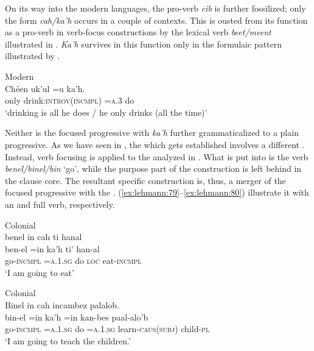 \documentclass[output=paper]{langsci/langscibook}
\begin{document}
On its way into the modern  languages, the pro-verb \textit{cib} is further fossilized; only the form \textit{cah/ka’h} occurs in a couple of contexts. This is ousted from its function as a pro-verb in verb-focus constructions by the lexical verb \textit{beet/meent} illustrated in . \textit{Ka’h} survives in this function only in the formulaic pattern illustrated by .

\ea\label{ex:lehmann:78}
Modern  \\
\gll       Chéen  uk’ul              =u    ka’h.\\
  only    drink:\textsc{introv(incmpl) } \textsc{=a.3}    do\\
\glt ‘drinking is all he does / he only drinks (all the time)’ \citep[77]{BriceñoChel1998}
\z

Neither is the focused progressive with \textit{ka’h} further grammaticalized to a plain progressive. As we have seen in , the  which gets established involves a different . Instead, verb focusing is applied to the  analyzed in . What is put into  is the verb \textit{benel/binel/bin} ‘go’, while the purpose part of the construction is left behind in the  clause core. The resultant specific construction is, thus, a merger of the focused progressive with the . (\ref{ex:lehmann:79}–\ref{ex:lehmann:80}) illustrate it with an  and  full verb, respectively.

\ea\label{ex:lehmann:79}
Colonial  \\
      benel      in        cah    ti      hanal\\
\gll   ben-el      =in      ka’h    ti’      han-al\\
go-\textsc{incmpl } \textsc{=a.1.sg}    do      \textsc{loc}    eat-\textsc{incmpl}\\
\glt ‘I am going to eat’ \citep[50]{Coronel1620}
\z

\ea\label{ex:lehmann:80}
Colonial  \\
      Binel      in        cah    incambez              palalob.\\
\gll   bin-el      =in      ka’h    =in      kan-bes        paal-alo’b\\
go-\textsc{incmpl } \textsc{=a.1.sg}    do      =\textsc{a.1.sg}   learn-\textsc{caus(subj)}  child-\textsc{pl}\\
\glt ‘I am going to teach the children.’ \citep[9Br]{SanBuenaventura1684}
\z
\end{document}
